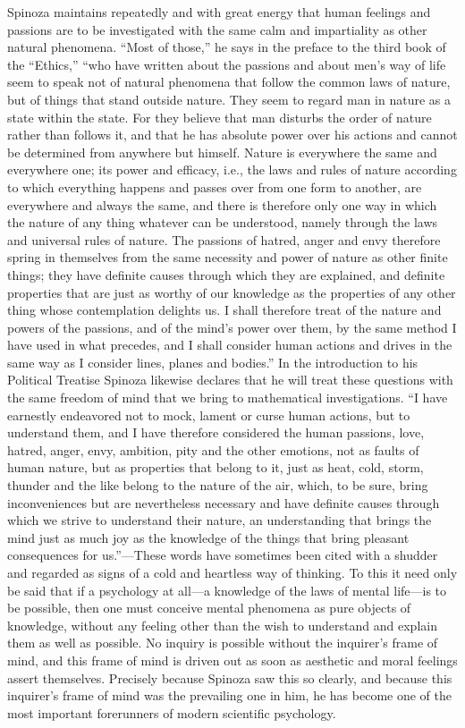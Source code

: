 \documentclass[12pt]{book}
\newcommand{\opage}[1]{\marginnote{\footnotesize\textit{[#1]}}}
\begin{document}
Spinoza maintains repeatedly and with great energy that human feelings and passions are
to be investigated with the same calm and impartiality as other natural phenomena.
``Most of those,'' he says in the preface to the third book of the ``Ethics,'' ``who have
written about the passions and about men's way of life seem to speak not of natural
phenomena that follow the common laws of nature, but of things that stand outside
nature. They seem to regard man in nature as a state within the state. For they believe
that man disturbs the order of nature rather than follows it, and that he has absolute
power over his actions and cannot be determined from anywhere but himself. Nature is
everywhere the same and everywhere one; its power and efficacy, i.e., the laws and rules
of nature according to which everything happens and passes over from one form to
another, are everywhere and always the same, and there is therefore only one way in
which the nature of any thing whatever can \opage{122}be understood, namely through the
laws and universal rules of nature. The passions of hatred, anger and envy therefore
spring in themselves from the same necessity and power of nature as other finite
things; they have definite causes through which they are explained, and definite
properties that are just as worthy of our knowledge as the properties of any other thing
whose contemplation delights us. I shall therefore treat of the nature and powers of the
passions, and of the mind's power over them, by the same method I have used in what
precedes, and I shall consider human actions and drives in the same way as I consider
lines, planes and bodies.'' In the introduction to his Political Treatise Spinoza
likewise declares that he will treat these questions with the same freedom of mind that
we bring to mathematical investigations. ``I have earnestly endeavored not to mock,
lament or curse human actions, but to understand them, and I have therefore considered
the human passions, love, hatred, anger, envy, ambition, pity and the other emotions,
not as faults of human nature, but as properties that belong to it, just as heat, cold,
storm, thunder and the like belong to the nature of the air, which, to be sure, bring
inconveniences but are nevertheless necessary and have definite causes through which we
strive to understand their nature, an understanding that brings the mind just as much
joy as the knowledge of the things that bring pleasant consequences for us.''---These
words have sometimes been cited with a shudder and regarded as \opage{123}signs of a
cold and heartless way of thinking. To this it need only be said that if a psychology
at all---a knowledge of the laws of mental life---is to be possible, then one must
conceive mental phenomena as pure objects of knowledge, without any feeling other than
the wish to understand and explain them as well as possible. No inquiry is possible
without the inquirer's frame of mind, and this frame of mind is driven out as soon as
aesthetic and moral feelings assert themselves. Precisely because Spinoza saw this so
clearly, and because this inquirer's frame of mind was the prevailing one in him, he
has become one of the most important forerunners of modern scientific psychology.
\end{document}
